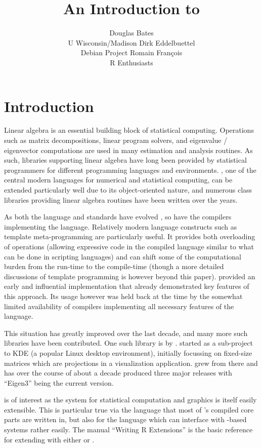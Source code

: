 \documentclass[shortnames,article]{jss}
\author{Douglas Bates\\U Wisconsin/Madison \And Dirk Eddelbuettel\\Debian Project \And Romain Fran\c{c}ois\\R Enthusiasts}
\title{An Introduction to \pkg{RcppEigen}}
\begin{document}

\section{Introduction}
\label{sec:intro}

Linear algebra is an essential building block of statistical computing.
Operations such as matrix decompositions, linear program solvers, and
eigenvalue / eigenvector computations are used in many estimation and
analysis routines. As such, libraries supporting linear algebra have long been
provided by statistical programmers for different programming languages and
environments. , one of the central modern languages for numerical
and statistical computing, can be extended particularly well due to its
object-oriented nature, and numerous class libraries providing linear algebra
routines have been written over the years.

As both the  language and standards have evolved
\citep{Meyers:2005:EffectiveC++,Meyers:1995:MoreEffectiveC++}, so have the
compilers implementing the language.  Relatively modern language constructs
such as template meta-programming are particularly useful. It provides both
overloading of operations (allowing expressive code in the compiled language
similar to what can be done in scripting languages) and can shift some of the
computational burden from the run-time to the compile-time (though a more
detailed discussions of template programming is however beyond this
paper). \cite{Veldhuizen:1998:Blitz} provided an early and influential
implementation that already demonstrated key features of this approach.  Its
usage however was held back at the time by the somewhat limited availability
of compilers implementing all necessary features of the 
language.

This situation has greatly improved over the last decade, and many more such
libraries have been contributed. One such  library is
 by \citet*{Eigen:Web}.  started as a sub-project to
KDE (a popular Linux desktop environment), initially focussing on fixed-size
matrices which are projections in a visualization application. 
grew from there and has over the course of about a decade produced three
major releases with ``Eigen3'' being the current version.

 is of interest as the  system for statistical
computation and graphics \citep{R:Main} is itself easily extensible. This is
particular true via the  language that most of 's
compiled core parts are written in, but also for the  language
which can interface with -based systems rather easily. The manual
``Writing R Extensions'' \citep{R:Extensions} is the basic reference for
extending  with either  or .
\end{document}

